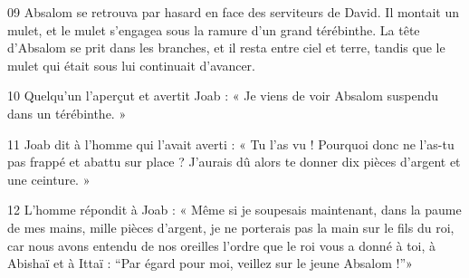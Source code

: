 
09 Absalom se retrouva par hasard en face des serviteurs de David. Il montait un mulet, et le mulet s’engagea sous la ramure d’un grand térébinthe. La tête d’Absalom se prit dans les branches, et il resta entre ciel et terre, tandis que le mulet qui était sous lui continuait d’avancer.

10 Quelqu’un l’aperçut et avertit Joab : « Je viens de voir Absalom suspendu dans un térébinthe. »

11 Joab dit à l’homme qui l’avait averti : « Tu l’as vu ! Pourquoi donc ne l’as-tu pas frappé et abattu sur place ? J’aurais dû alors te donner dix pièces d’argent et une ceinture. »

12 L’homme répondit à Joab : « Même si je soupesais maintenant, dans la paume de mes mains, mille pièces d’argent, je ne porterais pas la main sur le fils du roi, car nous avons entendu de nos oreilles l’ordre que le roi vous a donné à toi, à Abishaï et à Ittaï : “Par égard pour moi, veillez sur le jeune Absalom !”»
